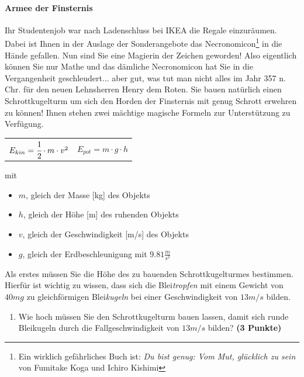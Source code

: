 \documentclass[a4paper, 9pt]{scrartcl}\usepackage[]{graphicx}\usepackage[]{xcolor}
\begin{document}
\paragraph{Armee der Finsternis}



Ihr Studentenjob war nach Ladenschluss bei IKEA die Regale
einzur{\"a}umen. Dabei ist Ihnen in der Auslage der Sonderangebote das
Necronomicon\footnote{Ein wirklich gef{\"a}hrliches Buch ist:
  \textit{Du bist genug: Vom Mut, gl{\"u}cklich zu sein} von Fumitake Koga und
  Ichiro Kishimi} in die H{\"a}nde gefallen. Nun sind Sie eine Magierin der
Zeichen geworden! Also eigentlich k{\"o}nnen Sie nur Mathe und das d{\"a}mliche
Necronomicon hat Sie in die Vergangenheit geschleudert... aber gut, was tut
man nicht alles im Jahr 357 n. Chr. f{\"u}r den neuen Lehnsherren
Henry dem Roten. Sie bauen nat{\"u}rlich einen Schrottkugelturm um sich den
Horden der Finsternis mit genug Schrott erwehren zu k{\"o}nnen! Ihnen stehen
zwei m{\"a}chtige magische Formeln zur Unterst{\"u}tzung zu Verf{\"u}gung.

\begin{center}
  \begin{tabular}{cc}
    $E_{kin} = \cfrac{1}{2}\cdot m \cdot v^2$ & $E_{pot} = m \cdot g \cdot h$\\
  \end{tabular}
\end{center}

mit

\begin{itemize}
\item $m$, gleich der Masse [kg] des Objekts
\item $h$, gleich der H{\"o}he [m] des ruhenden Objekts
\item $v$, gleich der Geschwindigkeit [m/s] des Objekts
\item $g$, gleich der Erdbeschleunigung mit $9.81 \tfrac{m}{s^2}$ 
\end{itemize}

Als erstes m{\"u}ssen Sie die H{\"o}he des zu bauenden Schrottkugelturmes
bestimmen. Hierf{\"u}r ist wichtig zu wissen, dass sich die
Blei\textit{tropfen} mit einem Gewicht von $40mg$ zu
gleichf{\"o}rmigen Blei\textit{kugeln} bei einer Geschwindigkeit von
$13m/s$ bilden.

\begin{enumerate}
\item Wie hoch m{\"u}ssen Sie den Schrottkugelturm bauen lassen, damit sich
  runde Bleikugeln durch die Fallgeschwindigkeit von $13m/s$ bilden?
  \textbf{(3 Punkte)}
\end{enumerate}
\end{document}

